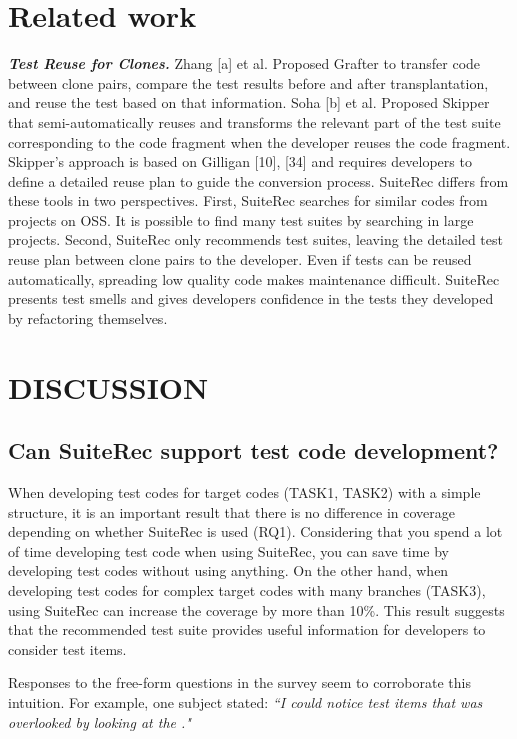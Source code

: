 \documentclass[conference]{IEEEtran}
\begin{document}
\section{Related work}
{\it \textbf{Test Reuse for Clones.}} Zhang [a] et al. Proposed Grafter to transfer code between clone pairs, compare the test results before and after transplantation, and reuse the test based on that information. Soha [b] et al. Proposed Skipper that semi-automatically reuses and transforms the relevant part of the test suite corresponding to the code fragment when the developer reuses the code fragment. Skipper's approach is based on Gilligan [10], [34] and requires developers to define a detailed reuse plan to guide the conversion process. SuiteRec differs from these tools in two perspectives. First, SuiteRec searches for similar codes from projects on OSS. It is possible to find many test suites by searching in large projects. Second, SuiteRec only recommends test suites, leaving the detailed test reuse plan between clone pairs to the developer. Even if tests can be reused automatically, spreading low quality code makes maintenance difficult. SuiteRec presents test smells and gives developers confidence in the tests they developed by refactoring themselves.

\section{DISCUSSION}
\subsection{Can SuiteRec support test code development?}
When developing test codes for target codes (TASK1, TASK2) with a simple structure, it is an important result that there is no difference in coverage depending on whether SuiteRec is used (RQ1). Considering that you spend a lot of time developing test code when using SuiteRec, you can save time by developing test codes without using anything. On the other hand, when developing test codes for complex target codes with many branches (TASK3), using SuiteRec can increase the coverage by more than 10\%. This result suggests that the recommended test suite provides useful information for developers to consider test items.

Responses to the free-form questions in the survey seem to corroborate this intuition. For example, one subject stated: {\it ``I could notice test items that was overlooked by looking at the ."}
\end{document}
